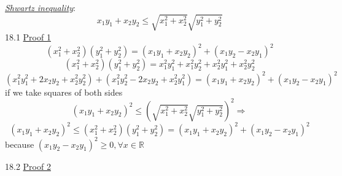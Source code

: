 \documentclass[a4paper, 11pt]{article}
\begin{document}
\hrulefill

\underline{\emph{Shwartz inequality}}:
$$x_1y_1 + x_2y_2 \leq \sqrt{x_1^2 + x_2^2}\sqrt{y_1^2 + y_2^2}$$
18.1 \underline{Proof 1}
$$(x_1^2 + x_2^2)(y_1^2 + y_2^2) = (x_1y_1 + x_2y_2)^2 + (x_1y_2 - x_2y_1)^2$$
$$(x_1^2 + x_2^2)(y_1^2 + y_2^2) = x_1^2y_1^2 + x_1^2y_2^2 + x_2^2y_1^2 + x_2^2y_2^2$$
$$(x_1^2y_1^2 + 2x_2y_2 + x_2^2y_2^2) + (x_1^2y_2^2 - 2x_2y_2 + x_2^2y_1^2) = (x_1y_1 + x_2y_2)^2 + (x_1y_2 - x_2y_1)^2$$
if we take squares of both sides
$$(x_1y_1 + x_2y_2)^2 \leq (\sqrt{x_1^2 + x_2^2}\sqrt{y_1^2 + y_2^2})^2 \Rightarrow$$
$$(x_1y_1 + x_2y_2)^2 \leq (x_1^2 + x_2^2)(y_1^2 + y_2^2) = (x_1y_1 + x_2y_2)^2 + (x_1y_2 - x_2y_1)^2$$
because $(x_1y_2 - x_2y_1)^2 \geq 0, \forall x \in \mathbb{R}$ 

\hrulefill

18.2 \underline{Proof 2}
\end{document}
